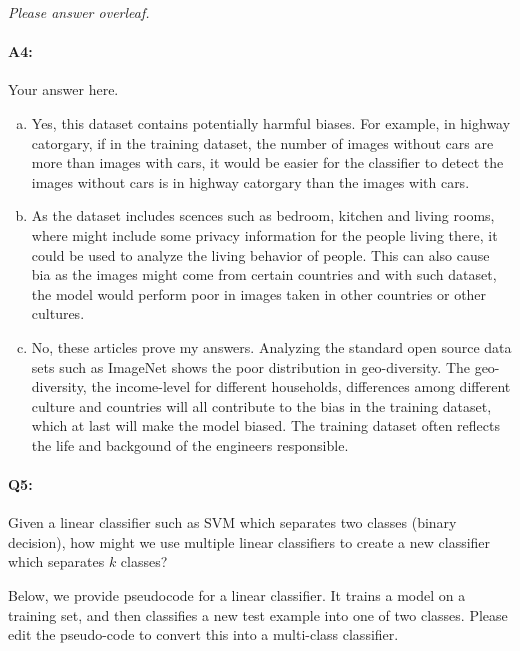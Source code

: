 \emph{Please answer overleaf.}

\pagebreak
\paragraph{A4:} Your answer here.

\begin{enumerate}[(a)]

    \item Yes, this dataset contains potentially harmful biases. For example, in highway catorgary, if in the training dataset, the number of images without cars are more than images with cars, it would be easier for the classifier to detect the images without cars is in highway catorgary than the images with cars.
    \item As the dataset includes scences such as bedroom, kitchen and living rooms, where might include some privacy information for the people living there, it could be used to analyze the living behavior of people. This can also cause bia as the images might come from certain countries and with such dataset, the model would perform poor in images taken in other countries or other cultures.
    \item No, these articles prove my answers. Analyzing the standard open source data sets such as ImageNet shows the poor distribution in geo-diversity. The geo-diversity, the income-level for different households, differences among different culture and countries will all contribute to the bias in the training dataset, which at last will make the model biased. The training dataset often reflects the life and backgound of the engineers responsible.

\end{enumerate}




\pagebreak
\paragraph{Q5:} Given a linear classifier such as SVM which separates two classes (binary decision), how might we use multiple linear classifiers to create a new classifier which separates $k$ classes?

Below, we provide pseudocode for a linear classifier. It trains a model on a training set, and then classifies a new test example into one of two classes. Please edit the pseudo-code to convert this into a multi-class classifier.

